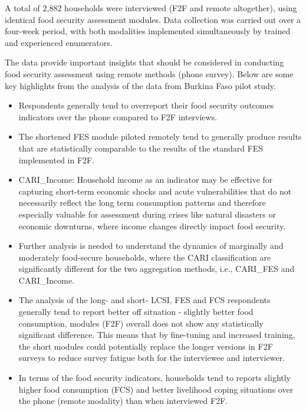 \documentclass[11pt,harvard]{article}
\begin{document}
	A total of 2,882 households were interviewed (F2F and remote altogether), using identical food security assessment modules. Data collection was carried out over a four-week period, with both modalities implemented simultaneously by trained and experienced enumerators. 
	
	The data provide important insights that should be considered in conducting food security assessment using remote methods (phone survey). Below are some key highlights from the analysis of the data from Burkina Faso pilot study.
	
	\begin{itemize}[left=2.5em]
		\item Respondents generally tend to overreport their food security outcomes indicators over the phone compared to F2F interviews. 
		\item The shortened FES module piloted remotely tend to generally produce results that are statistically comparable to the results of the standard FES implemented in F2F. 
		\item CARI\_Income: Household income as an indicator may be effective for capturing short-term economic shocks and acute vulnerabilities that do not necessarily reflect the long term consumption patterns and therefore especially valuable for assessment during crises like natural disasters or economic downturns, where income changes directly impact food security.
		\item Further analysis is needed to understand the dynamics of marginally and moderately food-secure households, where the CARI classification are significantly different for the two aggregation methods, i.e., CARI\_FES and CARI\_Income.
		\item The analysis of the long- and short- LCSI, FES and FCS respondents generally tend to report better off situation - slightly better food consumption, modules (F2F) overall does not show any statistically significant difference. This means that by fine-tuning and increased training, the short modules could potentially replace the longer versions in F2F surveys to reduce survey fatigue both for the interviewee and interviewer.
		\item In terms of the food security indicators, households tend to reports slightly higher food consumption (FCS) and better livelihood coping situations over the phone (remote modality) than when interviewed F2F. 
	\end{itemize}
	
\end{document}
